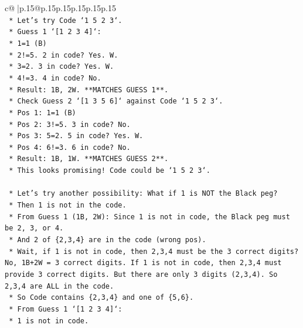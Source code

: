 \documentclass{article}
\begin{document}
{\begin{supertabular}{c@{$\;$}|p{.15\linewidth}@{}p{.15\linewidth}p{.15\linewidth}p{.15\linewidth}p{.15\linewidth}p{.15\linewidth}}
{{{\\ 
\texttt{            *   Let's try Code `1 5 2 3`.} \\
\texttt{                *   Guess 1 `{[}1 2 3 4{]}`:} \\
\texttt{                    *   1=1 (B)} \\
\texttt{                    *   2!=5. 2 in code? Yes. W.} \\
\texttt{                    *   3=2. 3 in code? Yes. W.} \\
\texttt{                    *   4!=3. 4 in code? No.} \\
\texttt{                    *   Result: 1B, 2W. **MATCHES GUESS 1**.} \\
\texttt{                *   Check Guess 2 `{[}1 3 5 6{]}` against Code `1 5 2 3`.} \\
\texttt{                    *   Pos 1: 1=1 (B)} \\
\texttt{                    *   Pos 2: 3!=5. 3 in code? No.} \\
\texttt{                    *   Pos 3: 5=2. 5 in code? Yes. W.} \\
\texttt{                    *   Pos 4: 6!=3. 6 in code? No.} \\
\texttt{                    *   Result: 1B, 1W. **MATCHES GUESS 2**.} \\
\texttt{                *   This looks promising! Code could be `1 5 2 3`.} \\
\\ 
\texttt{            *   Let's try another possibility: What if 1 is NOT the Black peg?} \\
\texttt{                *   Then 1 is not in the code.} \\
\texttt{                *   From Guess 1 (1B, 2W): Since 1 is not in code, the Black peg must be 2, 3, or 4.} \\
\texttt{                *   And 2 of \{2,3,4\} are in the code (wrong pos).} \\
\texttt{                *   Wait, if 1 is not in code, then 2,3,4 must be the 3 correct digits? No, 1B+2W = 3 correct digits. If 1 is not in code, then 2,3,4 must provide 3 correct digits. But there are only 3 digits (2,3,4). So 2,3,4 are ALL in the code.} \\
\texttt{                *   So Code contains \{2,3,4\} and one of \{5,6\}.} \\
\texttt{                *   From Guess 1 `{[}1 2 3 4{]}`:} \\
\texttt{                    *   1 is not in code.} \\
}}}
\end{supertabular}}
\end{document}
